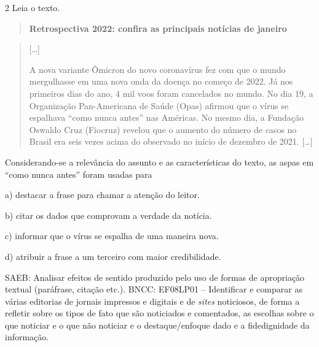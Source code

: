 \num{2} Leia o texto.

\begin{quote}
\textbf{Retrospectiva 2022: confira as principais notícias de janeiro}
\end{quote}

\begin{quote}
{[}\ldots{]}

A nova variante Ômicron do novo coronavírus fez com que o mundo
mergulhasse em uma nova onda da doença no começo de 2022. Já nos
primeiros dias do ano, 4 mil voos foram cancelados no mundo. No dia 19,
a Organização Pan-Americana de Saúde (Opas) afirmou que o vírus se
espalhava ``como nunca antes'' nas Américas. No mesmo dia, a Fundação
Oswaldo Cruz (Fiocruz) revelou que o aumento do número de casos no
Brasil era seis vezes acima do observado no início de dezembro de 2021.
{[}\ldots{]}
\end{quote}


Considerando-se a relevância do assunto e as características do texto,
as aspas em ``como nunca antes'' foram usadas para

a) destacar a frase para chamar a atenção do leitor.

b) citar os dados que comprovam a verdade da notícia.

c) informar que o vírus se espalha de uma maneira nova.

d) atribuir a frase a um terceiro com maior credibilidade.

SAEB: Analisar efeitos de sentido produzido pelo uso de formas de
apropriação textual (paráfrase, citação etc.). BNCC: EF08LP01 --
Identificar e comparar as várias editorias de jornais impressos e
digitais e de \emph{sites} noticiosos, de forma a refletir sobre os
tipos de fato que são noticiados e comentados, as escolhas sobre o que
noticiar e o que não noticiar e o destaque/enfoque dado e a
fidedignidade da informação.

